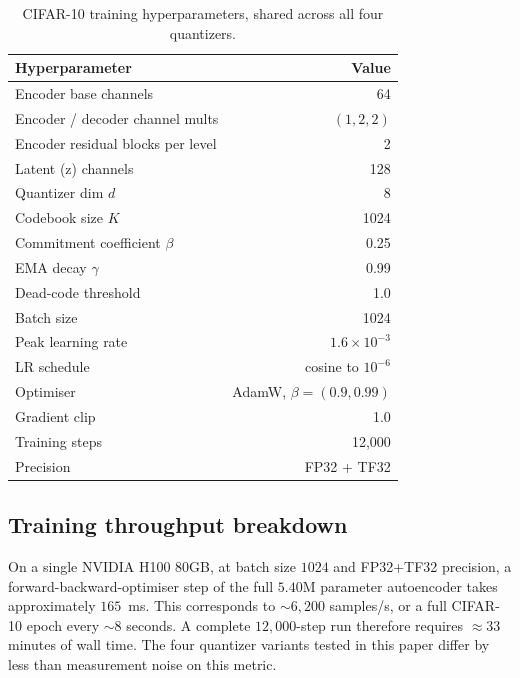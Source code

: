 \begin{table}[h]
\centering
\small
\begin{tabular}{lr}
\toprule
Hyperparameter & Value \\
\midrule
Encoder base channels              & 64 \\
Encoder / decoder channel mults    & $(1, 2, 2)$ \\
Encoder residual blocks per level  & 2 \\
Latent (z) channels                & 128 \\
Quantizer dim $d$                  & 8 \\
Codebook size $K$                  & 1024 \\
Commitment coefficient $\beta$     & 0.25 \\
EMA decay $\gamma$                 & 0.99 \\
Dead-code threshold                & 1.0 \\
Batch size                         & 1024 \\
Peak learning rate                 & $1.6\times 10^{-3}$ \\
LR schedule                        & cosine to $10^{-6}$ \\
Optimiser                          & AdamW, $\beta=(0.9,0.99)$ \\
Gradient clip                      & 1.0 \\
Training steps                     & 12{,}000 \\
Precision                          & FP32 + TF32 \\
\bottomrule
\end{tabular}
\caption{CIFAR-10 training hyperparameters, shared across all four
quantizers.}
\end{table}

\subsection{Training throughput breakdown}

On a single NVIDIA H100 80GB, at batch size $1024$ and FP32+TF32
precision, a forward-backward-optimiser step of the full $5.40$M
parameter autoencoder takes approximately $165$~ms. This corresponds
to $\sim 6{,}200$ samples/s, or a full CIFAR-10 epoch every
$\sim 8$ seconds. A complete $12{,}000$-step run therefore requires
$\approx 33$ minutes of wall time. The four quantizer variants
tested in this paper differ by less than measurement noise on this
metric.

